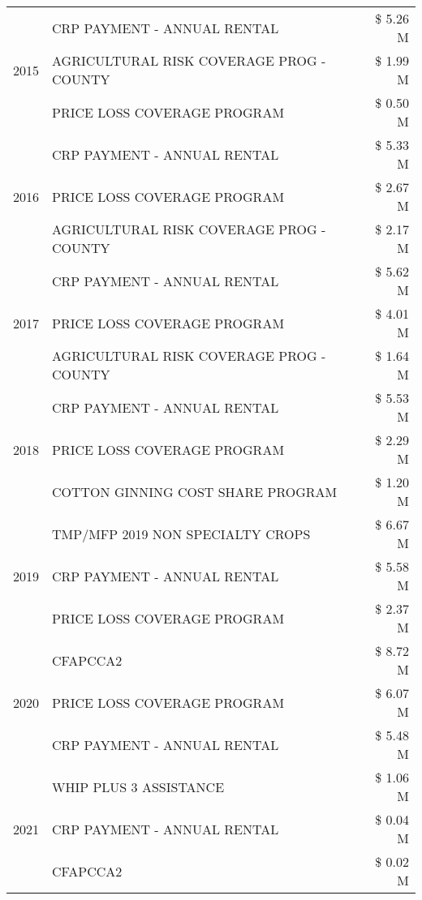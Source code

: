 \begin{tabular}{llr}
\cline{1-3}
\multirow[t]{3}{*}{2015} & CRP PAYMENT - ANNUAL RENTAL & \$ 5.26 M \\
 & AGRICULTURAL RISK COVERAGE PROG - COUNTY & \$ 1.99 M \\
 & PRICE LOSS COVERAGE PROGRAM & \$ 0.50 M \\
\cline{1-3}
\multirow[t]{3}{*}{2016} & CRP PAYMENT - ANNUAL RENTAL & \$ 5.33 M \\
 & PRICE LOSS COVERAGE PROGRAM & \$ 2.67 M \\
 & AGRICULTURAL RISK COVERAGE PROG - COUNTY & \$ 2.17 M \\
\cline{1-3}
\multirow[t]{3}{*}{2017} & CRP PAYMENT - ANNUAL RENTAL & \$ 5.62 M \\
 & PRICE LOSS COVERAGE PROGRAM & \$ 4.01 M \\
 & AGRICULTURAL RISK COVERAGE PROG - COUNTY & \$ 1.64 M \\
\cline{1-3}
\multirow[t]{3}{*}{2018} & CRP PAYMENT - ANNUAL RENTAL & \$ 5.53 M \\
 & PRICE LOSS COVERAGE PROGRAM & \$ 2.29 M \\
 & COTTON GINNING COST SHARE PROGRAM & \$ 1.20 M \\
\cline{1-3}
\multirow[t]{3}{*}{2019} & TMP/MFP 2019 NON SPECIALTY CROPS & \$ 6.67 M \\
 & CRP PAYMENT - ANNUAL RENTAL & \$ 5.58 M \\
 & PRICE LOSS COVERAGE PROGRAM & \$ 2.37 M \\
\cline{1-3}
\multirow[t]{3}{*}{2020} & CFAPCCA2 & \$ 8.72 M \\
 & PRICE LOSS COVERAGE PROGRAM & \$ 6.07 M \\
 & CRP PAYMENT - ANNUAL RENTAL & \$ 5.48 M \\
\cline{1-3}
\multirow[t]{3}{*}{2021} & WHIP PLUS 3 ASSISTANCE & \$ 1.06 M \\
 & CRP PAYMENT - ANNUAL RENTAL & \$ 0.04 M \\
 & CFAPCCA2 & \$ 0.02 M \\
\cline{1-3}
\bottomrule
\end{tabular}
